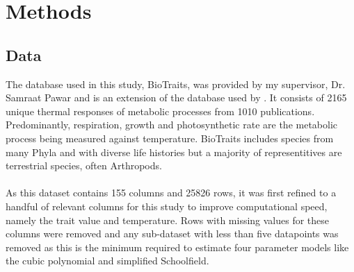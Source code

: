 \documentclass[twoside,twocolumn]{article}
\begin{document}
\section{Methods}

\subsection{Data}
The database used in this study, BioTraits, was provided by my supervisor,
Dr. Samraat Pawar and is an extension of the database used by \cite{Dell2011}. It consists of 
2165 unique thermal responses of metabolic 
processes from 1010 publications. Predominantly, respiration, growth and photosynthetic
rate are the metabolic process being measured against temperature. BioTraits includes species from many 
Phyla and with diverse life histories but a majority of representitives are terrestrial
species, often Arthropods. 
\\
\\
As this dataset contains 155 columns and 25826 rows, it was first refined to a handful
of relevant columns for this study to improve computational speed, namely the trait value and temperature.
Rows with missing values for these columns were removed and any sub-dataset with less than five 
datapoints was removed as this is the minimum required to estimate four parameter models like the cubic
polynomial and simplified Schoolfield. 
\end{document}
